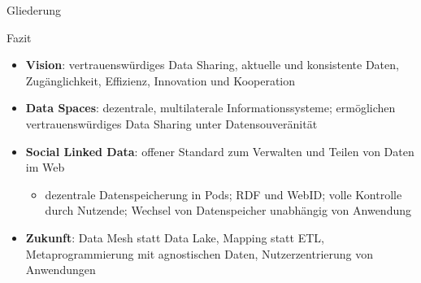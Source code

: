 




\maketitle



\begin{frame}{Gliederung}
    \tableofcontents
\end{frame}











\begin{frame}{Fazit}
    \begin{itemize}
        \item \textbf{Vision}: vertrauenswürdiges Data Sharing, aktuelle und konsistente Daten, Zugänglichkeit, Effizienz, Innovation und Kooperation
        \item \textbf{Data Spaces}: dezentrale, multilaterale Informationssysteme; ermöglichen vertrauenswürdiges Data Sharing unter Datensouveränität
        \item \textbf{Social Linked Data}: offener Standard zum Verwalten und Teilen von Daten im Web
        \begin{itemize}
            \item dezentrale Datenspeicherung in Pods; RDF und WebID; volle Kontrolle durch Nutzende; Wechsel von Datenspeicher unabhängig von Anwendung
        \end{itemize}
        \item \textbf{Zukunft}: Data  Mesh statt Data Lake, Mapping statt ETL, Metaprogrammierung mit agnostischen Daten, Nutzerzentrierung von Anwendungen
    \end{itemize}
\end{frame}


